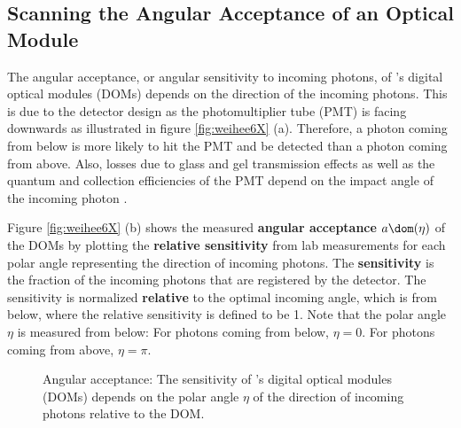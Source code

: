 
\subsection{Scanning the Angular Acceptance of an Optical Module}
\label{sec:angular_acceptance_scan}

The angular acceptance, or angular sensitivity to incoming photons, of \icecube's digital optical modules (DOMs) depends on the direction of the incoming photons.
This is due to the detector design as the photomultiplier tube (PMT) is facing downwards as illustrated in figure \ref{fig:weihee6X} (a). Therefore, a photon coming from below is more likely to hit the PMT and be detected than a photon coming from above. Also, losses due to glass and gel transmission effects as well as the quantum and collection efficiencies of the PMT depend on the impact angle of the incoming photon \cite{icepaper}.


Figure \ref{fig:weihee6X} (b) shows the measured \textbf{angular acceptance} $a\dom(\eta)$ of the \icecube DOMs by plotting the \textbf{relative sensitivity} from lab measurements for each polar angle representing the direction of incoming photons. \cite{icepaper} The \textbf{sensitivity} is the fraction of the incoming photons that are registered by the detector. The sensitivity is normalized \textbf{relative} to the optimal incoming angle, which is from below, where the relative sensitivity is defined to be 1. Note that the polar angle $\eta$ is measured from below: For photons coming from below, $\eta = 0$. For photons coming from above, $\eta = \pi$.

\begin{figure}[htbp]
  \hfill
  \caption{Angular acceptance: The sensitivity of \icecube's digital optical modules (DOMs) depends on the polar angle $\eta$ of the direction of incoming photons relative to the DOM.}
  \label{fig:weihee6X}\label{fig:icepaper}
\end{figure}


